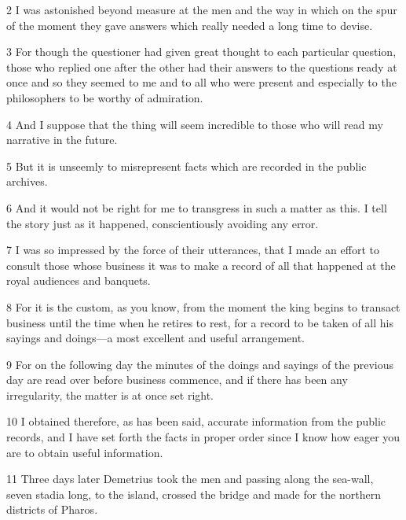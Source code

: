 \par 2 I was astonished beyond measure at the men and the way in which on the spur of the moment they gave answers which really needed a long time to devise.

\par 3 For though the questioner had given great thought to each particular question, those who replied one after the other had their answers to the questions ready at once and so they seemed to me and to all who were present and especially to the philosophers to be worthy of admiration.

\par 4 And I suppose that the thing will seem incredible to those who will read my narrative in the future.

\par 5 But it is unseemly to misrepresent facts which are recorded in the public archives.

\par 6 And it would not be right for me to transgress in such a matter as this. I tell the story just as it happened, conscientiously avoiding any error.

\par 7 I was so impressed by the force of their utterances, that I made an effort to consult those whose business it was to make a record of all that happened at the royal audiences and banquets.

\par 8 For it is the custom, as you know, from the moment the king begins to transact business until the time when he retires to rest, for a record to be taken of all his sayings and doings—a most excellent and useful arrangement.

\par 9 For on the following day the minutes of the doings and sayings of the previous day are read over before business commence, and if there has been any irregularity, the matter is at once set right.

\par 10 I obtained therefore, as has been said, accurate information from the public records, and I have set forth the facts in proper order since I know how eager you are to obtain useful information.

\par 11 Three days later Demetrius took the men and passing along the sea-wall, seven stadia long, to the island, crossed the bridge and made for the northern districts of Pharos.

